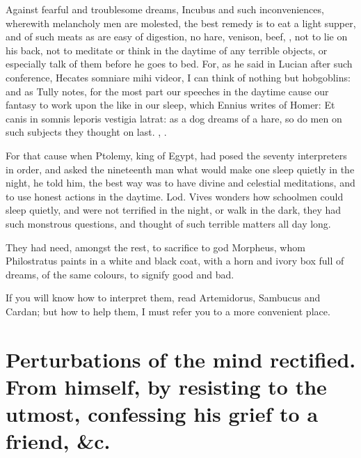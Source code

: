 {Against fearful and troublesome dreams, Incubus and such
inconveniences, wherewith melancholy men are molested, the best remedy
is to eat a light supper, and of such meats as are easy of digestion,
no hare, venison, beef, \etc{}, not to lie on his back, not to meditate or
think in the daytime of any terrible objects, or especially talk of
them before he goes to bed. For, as he said in Lucian after such
conference, Hecates somniare mihi videor, I can think of nothing but
hobgoblins: and as Tully notes,  for the most part our speeches
in the daytime cause our fantasy to work upon the like in our sleep,
which Ennius writes of Homer: Et canis in somnis leporis vestigia
latrat: as a dog dreams of a hare, so do men on such subjects they
thought on last.
, \etc{}.

For that cause when Ptolemy, king of Egypt, had posed the seventy
interpreters in order, and asked the nineteenth man what would make one
sleep quietly in the night, he told him, the best way was to have
divine and celestial meditations, and to use honest actions in the
daytime. Lod. Vives wonders how schoolmen could sleep quietly,
and were not terrified in the night, or walk in the dark, they had such
monstrous questions, and thought of such terrible matters all day long.

They had need, amongst the rest, to sacrifice to god Morpheus, whom
 Philostratus paints in a white and black coat, with a horn and
ivory box full of dreams, of the same colours, to signify good and bad.

If you will know how to interpret them, read Artemidorus, Sambucus and
Cardan; but how to help them, I must refer you to a more
convenient place.


\section[Perturbations of the mind]{Perturbations of the mind rectified. From himself, by resisting to the utmost, confessing his grief to a friend, \&c.}

}
